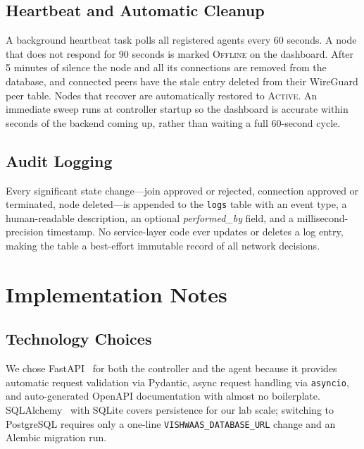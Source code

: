 \documentclass[conference]{IEEEtran}
\begin{document}
\subsection{Heartbeat and Automatic Cleanup}

A background heartbeat task polls all registered agents every 60 seconds.
A node that does not respond for 90 seconds is marked \textsc{Offline} on
the dashboard. After 5 minutes of silence the node and all its connections
are removed from the database, and connected peers have the stale entry
deleted from their WireGuard peer table. Nodes that recover are automatically
restored to \textsc{Active}. An immediate sweep runs at controller startup
so the dashboard is accurate within seconds of the backend coming up, rather
than waiting a full 60-second cycle.

\subsection{Audit Logging}

Every significant state change---join approved or rejected, connection
approved or terminated, node deleted---is appended to the \texttt{logs}
table with an event type, a human-readable description, an optional
\textit{performed\_by} field, and a millisecond-precision timestamp. No
service-layer code ever updates or deletes a log entry, making the table
a best-effort immutable record of all network decisions.


\section{Implementation Notes}
\label{sec:implementation}

\subsection{Technology Choices}

We chose FastAPI~\cite{fastapi} for both the controller and the agent because
it provides automatic request validation via Pydantic, async request handling
via \texttt{asyncio}, and auto-generated OpenAPI documentation with almost no
boilerplate. SQLAlchemy~\cite{sqlalchemy} with SQLite covers persistence for
our lab scale; switching to PostgreSQL requires only a one-line
\texttt{VISHWAAS\_DATABASE\_URL} change and an Alembic migration run.
\end{document}
